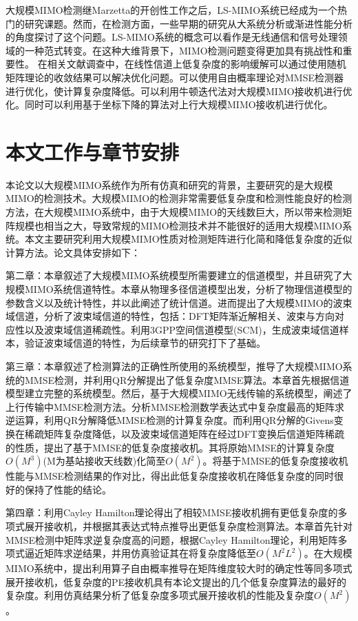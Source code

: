 \documentclass[bachelor,nocolorlinks, printoneside]{seuthesis} %
\begin{document}
\begin{Main}
大规模MIMO检测继Marzetta的开创性工作之后，LS-MIMO系统已经成为一个热门的研究课题。然而，在检测方面，一些早期的研究从大系统分析或渐进性能分析的角度探讨了这个问题。LS-MIMO系统的概念可以看作是无线通信和信号处理领域的一种范式转变。在这种大维背景下，MIMO检测问题变得更加具有挑战性和重要性。
在相关文献调查中，在线性信道上低复杂度的影响缓解可以通过使用随机矩阵理论的收敛结果可以解决优化问题。可以使用自由概率理论\cite{hachem2004simple}对MMSE检测器进行优化，使计算复杂度降低。可以利用牛顿迭代法对大规模MIMO接收机进行优化\cite{tang2016high}。同时可以利用基于坐标下降的算法对上行大规模MIMO接收机进行优化。

\section{本文工作与章节安排}
本论文以大规模MIMO系统作为所有仿真和研究的背景，主要研究的是大规模MIMO的检测技术。大规模MIMO的检测非常需要低复杂度和检测性能良好的检测方法，在大规模MIMO系统中，由于大规模MIMO的天线数巨大，所以带来检测矩阵规模也相当之大，导致常规的MIMO检测技术并不能很好的适用大规模MIMO系统。本文主要研究利用大规模MIMO性质对检测矩阵进行化简和降低复杂度的近似计算方法。论文具体安排如下：

第二章：本章叙述了大规模MIMO系统模型所需要建立的信道模型，并且研究了大规模MIMO系统信道特性。本章从物理多径信道模型出发，分析了物理信道模型的参数含义以及统计特性，并以此阐述了统计信道。进而提出了大规模MIMO的波束域信道，分析了波束域信道的特性，包括：DFT矩阵渐近解相关、波束与方向对应性以及波束域信道稀疏性。利用3GPP空间信道模型(SCM)，生成波束域信道样本，验证波束域信道的特性，为后续章节的研究打下了基础。

第三章：本章叙述了检测算法的正确性所使用的系统模型，推导了大规模MIMO系统的MMSE检测，并利用QR分解提出了低复杂度MMSE算法。本章首先根据信道模型建立完整的系统模型。然后，基于大规模MIMO无线传输的系统模型，阐述了上行传输中MMSE检测方法。分析MMSE检测数学表达式中复杂度最高的矩阵求逆运算，利用QR分解降低MMSE检测的计算复杂度。而利用QR分解的Givens变换在稀疏矩阵复杂度降低，以及波束域信道矩阵在经过DFT变换后信道矩阵稀疏的性质，提出了基于MMSE的低复杂度接收机。其将原始MMSE的计算复杂度$O(M^3)$(M为基站接收天线数)化简至$O(M^2)$。将基于MMSE的低复杂度接收机性能与MMSE检测结果的作对比，得出此低复杂度接收机在降低复杂度的同时很好的保持了性能的结论。

第四章：利用Cayley Hamilton理论得出了相较MMSE接收机拥有更低复杂度的多项式展开接收机，并根据其表达式特点推导出更低复杂度检测算法。本章首先针对MMSE检测中矩阵求逆复杂度高的问题，根据Cayley Hamilton理论，利用矩阵多项式逼近矩阵求逆结果，并用仿真验证其在将复杂度降低至$O(M^2L^2)$。在大规模MIMO系统中，提出利用算子自由概率推导在矩阵维度较大时的确定性等同多项式展开接收机，低复杂度的PE接收机具有本论文提出的几个低复杂度算法的最好的复杂度。利用仿真结果分析了低复杂度多项式展开接收机的性能及复杂度$O(M^2)$。


\end{Main}
\end{document}
